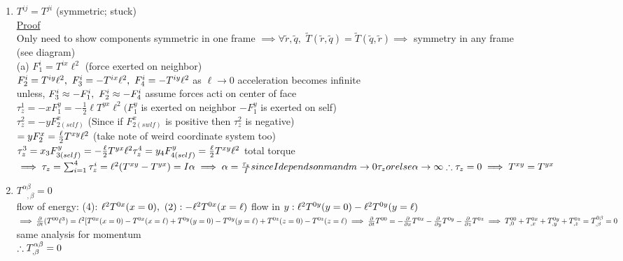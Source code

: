 \documentclass[12pt]{amsart}
\begin{document}
\begin{enumerate}
\item \underline{$T^{ij} = T^{ji}$} (symmetric; stuck)\\
\underline{Proof}\\
Only need to show components symmetric in one frame $\implies \forall \tilde{r}, \tilde{q},\,\, \tilde{T}(\tilde{r}, \tilde{q}) = \tilde{T}( \tilde{q}, \tilde{r}) \implies$ symmetry in any frame\\
(see diagram)\\
(a) $F^i_1 = T^{ix} \ell^2$ (force exerted on neighbor)\\
$F^i_2 = T^{iy} \ell^2,\,\, F^i_3 = - T^{ix} \ell^2,\,\, F^i_4 = - T^{iy} \ell^2\\$
as $\ell \rightarrow 0$ acceleration becomes infinite\\
unless,$\,\, F^i_3 \approx - F^i_1,\,\, F^i_2 \approx - F_4^i\\$
assume forces acti on center of face\\
$\tau_z^1 = - x F_1^y = - \frac{1}{2} \ell T^{yx} \ell^2 (F_1^y$ is exerted on neighbor $-F_1^y$ is exerted on self)\\
$\tau_z^2 = - y F_{2 (self)}^x$ (Since if $F_{2(swlf)}^x$ is positive then $\tau_z^2$ is negative)\\
$= y F_2^x = \frac{\ell}{2} T^{xy} \ell^2\\$
(take note of weird coordinate system too)\\
$\tau_z^3 = x_3 F_{3 (self)}^y = - \frac{\ell}{2} T^{yx} \ell^2\\
\tau_z^4 = y_4 F_{4 (self)}^y = \frac{\ell}{2} T^{xy} \ell^2\\$
total torque\\
$\implies \tau_z = \sum_{i=1}^4 \tau_z^i = \ell^2 (T^{xy} - T^{yx} ) = I \alpha\\
\implies \alpha= \frac{\tau_z}{I} since I depends on m and m \rightarrow 0 \tau_z or else \alpha \rightarrow \infty\\
\therefore \tau_z = 0\\
\implies T^{xy} = T^{yx}$


\hdashrule[0.5ex][c]{\linewidth}{0.5pt}{1.5mm}


\item \underline{$T^{\alpha \beta}_{\,\,\,\, , \beta}=0$}\\
flow of energy: (4): $\ell^2 T^{0x}(x=0),\,\, (2) : - \ell^2 T^{0x}(x=\ell)\\$
flow in $y: \ell^2 T^{0y}(y=0) - \ell^2 T^{0y}(y=\ell)\\$
$\implies \frac{\partial}{\partial t} (T^{00} \ell^3) = \ell^2 [ T^{0x} (x=0) - T^{0x} (x=\ell) + T^{0y}(y=0)\\
- T^{0y}(y= \ell) + T^{0 z} (z=0) - T^{0z} (z= \ell)\\
\implies \frac{\partial}{\partial t} T^{00} = - \frac{\partial}{\partial x} T^{0x} - \frac{\partial}{\partial y} T^{0y} - \frac{\partial}{\partial z} T^{0z}\\
\implies T^{00}_{,0} + T^{0x}_{,x} + T^{0y}_{,y} + T^{0z}_{,z} = T^{0 \beta}_{,\beta} =0\\$
same analysis for momentum\\
$\therefore T^{\alpha \beta}_{, \beta}=0\\$



\end{enumerate}
\end{document}

